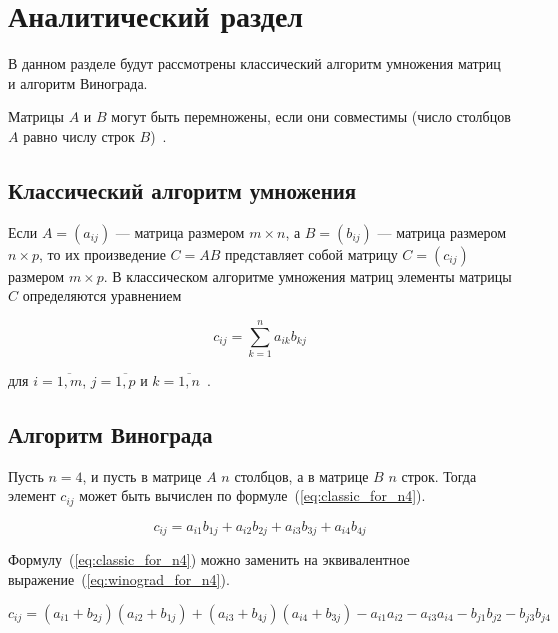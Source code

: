 \chapter{Аналитический раздел}

В данном разделе будут рассмотрены классический алгоритм умножения матриц и алгоритм Винограда.

Матрицы $A$ и $B$ могут быть перемножены, если они совместимы (число столбцов $A$ равно числу строк $B$)~\cite{kormen}.

\section{Классический алгоритм умножения}

Если $A = (a_{ij})$ --- матрица размером $m \times n$, а $B = (b_{ij})$ — матрица размером $n \times p$, то их произведение $C = AB$ представляет собой матрицу $C = (c_{ij})$ размером $m × p$. В классическом алгоритме умножения матриц элементы матрицы $C$ определяются уравнением

\begin{equation}
    \label{eq:classic_mult}
    c_{ij} = \sum_{k=1}^{n} a_{ik} b_{kj} 
\end{equation}

для $i = \overline{1, m}$, $j = \overline{1, p}$ и $k = \overline{1, n}$~\cite{kormen}.

\section{Алгоритм Винограда}

Пусть $n = 4$, и пусть в матрице $A$ $n$ столбцов, а в матрице $B$ $n$ строк. Тогда элемент $c_{ij}$ может быть вычислен по формуле~(\ref{eq:classic_for_n4}).

\begin{equation}
    \label{eq:classic_for_n4}
    c_{ij} = a_{i1} b_{1j} + a_{i2} b_{2j} + a_{i3} b_{3j} + a_{i4} b_{4j}
\end{equation}

Формулу~(\ref{eq:classic_for_n4}) можно заменить на эквивалентное выражение~(\ref{eq:winograd_for_n4}).

\begin{equation}
    \label{eq:winograd_for_n4}
    c_{ij} = (a_{i1} + b_{2j})(a_{i2} + b_{1j}) + (a_{i3} + b_{4j})(a_{i4} + b_{3j}) - a_{i1}a_{i2} - a_{i3}a_{i4} - b_{j1}b_{j2} - b_{j3}b_{j4}
\end{equation}

